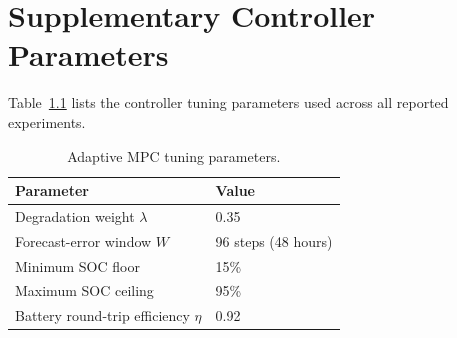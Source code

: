 \chapter{Supplementary Controller Parameters}
\label{app:parameters}

Table~\ref{tab:appendix} lists the controller tuning parameters used across all reported experiments.

\begin{table}[htbp]
\centering
\caption{Adaptive MPC tuning parameters.}
\label{tab:appendix}
\renewcommand{\arraystretch}{1.3}
\begin{tabularx}{\textwidth}{@{}l X@{}}
\toprule
\rowcolor{monashblue!10}
\textbf{Parameter} & \textbf{Value} \\
\midrule
Degradation weight $\lambda$ & 0.35 \\
Forecast-error window $W$ & 96 steps (48 hours) \\
Minimum SOC floor & 15\% \\
Maximum SOC ceiling & 95\% \\
Battery round-trip efficiency $\eta$ & 0.92 \\
\bottomrule
\end{tabularx}
\end{table}

